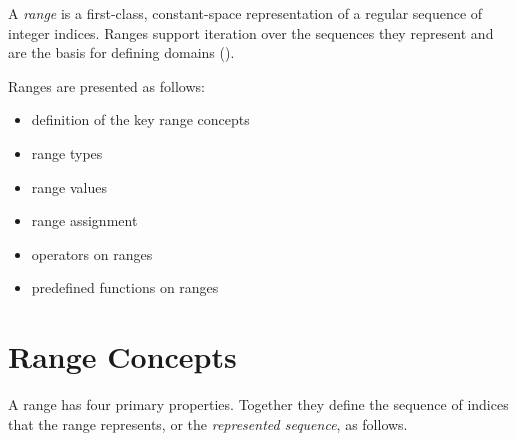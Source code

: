 \label{Ranges}

A \emph{range} is a first-class, constant-space representation of a
regular sequence of integer indices.
Ranges support iteration over the sequences they represent
and are the basis for defining domains ().

Ranges are presented as follows:
\begin{itemize}
\item definition of the key range concepts 
\item range types 
\item range values 
\item range assignment 
\item operators on ranges 
\item predefined functions on ranges 
\end{itemize}


\section{Range Concepts}
\label{Range_Concepts}

A range has four primary properties. Together they define the sequence
of indices that the range represents, or the \emph{represented sequence},
as follows.

